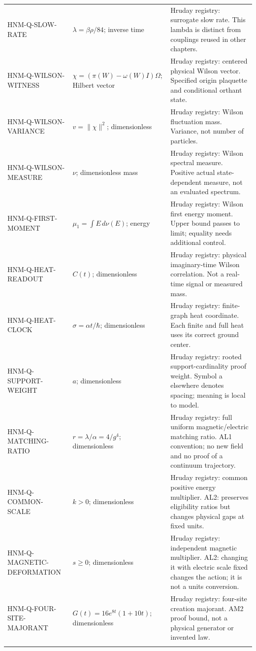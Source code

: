 \begin{longtable}{@{}p{37mm}p{40mm}p{72mm}@{}}
HNM-Q-SLOW-RATE & $\lambda=\beta\rho/84$; inverse time & Hruday registry: surrogate slow rate. This lambda is distinct from couplings reused in other chapters.\\\addlinespace
HNM-Q-WILSON-WITNESS & $\chi=(\pi(W)-\omega(W)I)\Omega$; Hilbert vector & Hruday registry: centered physical Wilson vector. Specified origin plaquette and conditional orthant state.\\\addlinespace
HNM-Q-WILSON-VARIANCE & $v=\|\chi\|^2$; dimensionless & Hruday registry: Wilson fluctuation mass. Variance, not number of particles.\\\addlinespace
HNM-Q-WILSON-MEASURE & $\nu$; dimensionless mass & Hruday registry: Wilson spectral measure. Positive actual state-dependent measure, not an evaluated spectrum.\\\addlinespace
HNM-Q-FIRST-MOMENT & $\mu_1=\int E\,d\nu(E)$; energy & Hruday registry: Wilson first energy moment. Upper bound passes to limit; equality needs additional control.\\\addlinespace
HNM-Q-HEAT-READOUT & $C(t)$; dimensionless & Hruday registry: physical imaginary-time Wilson correlation. Not a real-time signal or measured mass.\\\addlinespace
HNM-Q-HEAT-CLOCK & $\sigma=\alpha t/\hbar$; dimensionless & Hruday registry: finite-graph heat coordinate. Each finite and full heat uses its correct ground center.\\\addlinespace
HNM-Q-SUPPORT-WEIGHT & $a$; dimensionless & Hruday registry: rooted support-cardinality proof weight. Symbol a elsewhere denotes spacing; meaning is local to model.\\\addlinespace
HNM-Q-MATCHING-RATIO & $r=\lambda/\alpha=4/g^4$; dimensionless & Hruday registry: full uniform magnetic/electric matching ratio. AL1 convention; no new field and no proof of a continuum trajectory.\\\addlinespace
HNM-Q-COMMON-SCALE & $k>0$; dimensionless & Hruday registry: common positive energy multiplier. AL2: preserves eligibility ratios but changes physical gaps at fixed units.\\\addlinespace
HNM-Q-MAGNETIC-DEFORMATION & $s\ge0$; dimensionless & Hruday registry: independent magnetic multiplier. AL2: changing it with electric scale fixed changes the action; it is not a units conversion.\\\addlinespace
HNM-Q-FOUR-SITE-MAJORANT & $G(t)=16e^{8t}(1+10t)$; dimensionless & Hruday registry: four-site creation majorant. AM2 proof bound, not a physical generator or invented law.\\\addlinespace

\end{longtable}
